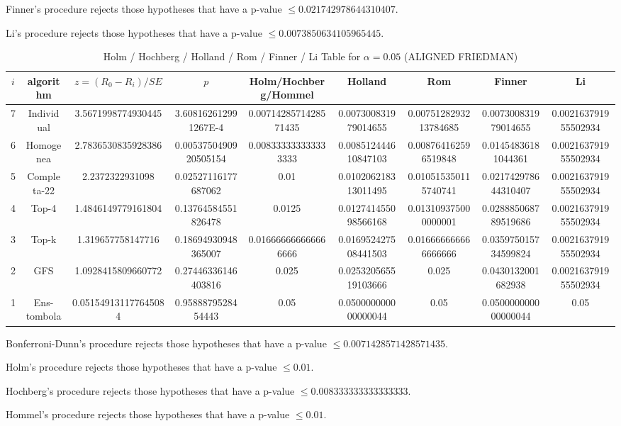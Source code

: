 \documentclass[a4paper,10pt]{article}
\begin{document}
\begin{landscape}
Finner's procedure rejects those hypotheses that have a p-value $\le0.021742978644310407$.


Li's procedure rejects those hypotheses that have a p-value $\le0.0073850634105965445$.



\newpage

\begin{table}[!htp]
\centering\scriptsize
\caption{Holm / Hochberg / Holland / Rom / Finner / Li Table for $\alpha=0.05$ (ALIGNED FRIEDMAN)}
\begin{tabular}{ccccccccc}
$i$&algorithm&$z=(R_0 - R_i)/SE$&$p$&Holm/Hochberg/Hommel&Holland&Rom&Finner&Li\\
\hline
7&Individual&3.5671998774930445&3.608162612991267E-4&0.0071428571428571435&0.007300831979014655&0.0075128293213784685&0.007300831979014655&0.002163791955502934\\
6&Homogenea&2.7836530835928386&0.0053750490920505154&0.008333333333333333&0.008512444610847103&0.008764162596519848&0.01454836181044361&0.002163791955502934\\
5&Completa-22&2.2372322931098&0.02527116177687062&0.01&0.010206218313011495&0.010515350115740741&0.021742978644310407&0.002163791955502934\\
4&Top-4&1.4846149779161804&0.13764584551826478&0.0125&0.012741455098566168&0.013109375000000001&0.028885068789519686&0.002163791955502934\\
3&Top-k&1.319657758147716&0.18694930948365007&0.016666666666666666&0.016952427508441503&0.016666666666666666&0.035975015734599824&0.002163791955502934\\
2&GFS&1.0928415809660772&0.27446336146403816&0.025&0.025320565519103666&0.025&0.0430132001682938&0.002163791955502934\\
1&Ens-tombola&0.051549131177645084&0.9588879528454443&0.05&0.050000000000000044&0.05&0.050000000000000044&0.05\\
\hline
\end{tabular}
\end{table}
Bonferroni-Dunn's procedure rejects those hypotheses that have a p-value $\le0.0071428571428571435$.


Holm's procedure rejects those hypotheses that have a p-value $\le0.01$.


Hochberg's procedure rejects those hypotheses that have a p-value $\le0.008333333333333333$.


Hommel's procedure rejects those hypotheses that have a p-value $\le0.01$.



\end{landscape}
\end{document}

